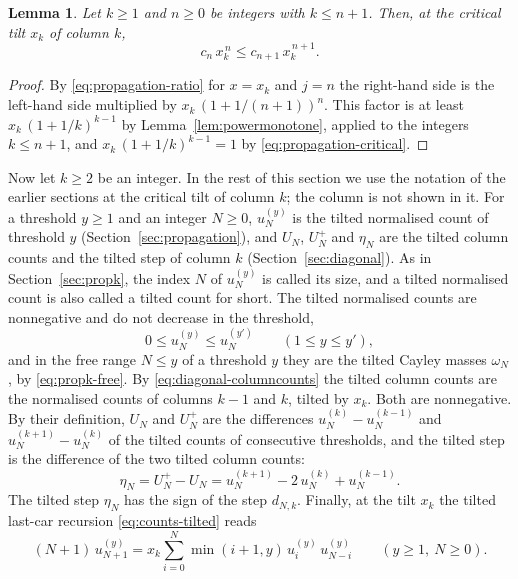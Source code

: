 \documentclass{amsart}
\newtheorem{lemma}[theorem]{Lemma}
\theoremstyle{definition}
\theoremstyle{remark}
\numberwithin{equation}{section}
\begin{document}
\begin{lemma}\label{lem:massesincrease}
Let $k\ge1$ and $n\ge0$ be integers with $k\le n+1$. Then, at the critical
tilt $x_k$ of column $k$,
\[
c_n\,x_k^{\,n}\le c_{n+1}\,x_k^{\,n+1} .
\]
\end{lemma}

\begin{proof}
By \eqref{eq:propagation-ratio} for $x=x_k$ and $j=n$ the right-hand side
is the left-hand side multiplied by $x_k\,(1+1/(n+1))^{n}$. This factor is
at least
$x_k\,(1+1/k)^{k-1}$ by Lemma~\ref{lem:powermonotone}, applied to the
integers $k\le n+1$, and $x_k\,(1+1/k)^{k-1}=1$ by
\eqref{eq:propagation-critical}.
\end{proof}

Now let $k\ge2$ be an integer. In the rest of this section we use the
notation of the earlier sections at the critical tilt of column $k$; the
column is not shown in it. For a threshold $y\ge1$ and an integer $N\ge0$,
$u^{(y)}_N$ is the tilted normalised count of threshold $y$
(Section~\ref{sec:propagation}), and $U_N$, $U^{+}_N$ and $\eta_N$ are the
tilted column counts and the tilted step of column $k$
(Section~\ref{sec:diagonal}). As in Section~\ref{sec:propk}, the index $N$
of $u^{(y)}_N$ is called its size, and a tilted normalised count is also
called a tilted count for short. The tilted normalised counts are
nonnegative and do not decrease in the threshold,
\begin{equation}\label{eq:beyond-order}
0\le u^{(y)}_N\le u^{(y')}_N\qquad(1\le y\le y'),
\end{equation}
and in the free range $N\le y$ of a threshold $y$ they are the tilted
Cayley masses $\omega_N$, by \eqref{eq:propk-free}. By
\eqref{eq:diagonal-columncounts} the tilted column counts are the
normalised counts of columns $k-1$ and $k$, tilted by $x_k$. Both are
nonnegative. By their definition, $U_N$ and $U^{+}_N$ are the differences
$u^{(k)}_N-u^{(k-1)}_N$ and $u^{(k+1)}_N-u^{(k)}_N$ of the tilted counts of
consecutive thresholds, and the tilted step is the difference of the two
tilted column counts:
\begin{equation}\label{eq:beyond-step}
\eta_N=U^{+}_N-U_N=u^{(k+1)}_N-2\,u^{(k)}_N+u^{(k-1)}_N .
\end{equation}
The tilted step $\eta_N$ has the sign of the step $d_{N,k}$. Finally, at
the tilt $x_k$ the tilted last-car recursion \eqref{eq:counts-tilted}
reads
\begin{equation}\label{eq:beyond-recursion}
(N+1)\,u^{(y)}_{N+1}=x_k\sum_{i=0}^{N}\min(i+1,y)\,u^{(y)}_i\,u^{(y)}_{N-i}
\qquad(y\ge1,\ N\ge0).
\end{equation}
\end{document}
